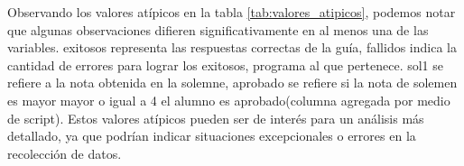 Observando los valores atípicos en la tabla \ref{tab:valores_atipicos}, podemos notar que algunas observaciones difieren significativamente en al menos una de las variables. exitosos representa las respuestas correctas de la guía, fallidos indica la cantidad de errores para lograr los exitosos, programa al que pertenece. sol1 se refiere a la nota obtenida en la solemne, aprobado se refiere si la nota de solemen es mayor mayor o igual a 4 el alumno es aprobado(columna agregada por medio de script). Estos valores atípicos pueden ser de interés para un análisis más detallado, ya que podrían indicar situaciones excepcionales o errores en la recolección de datos.
